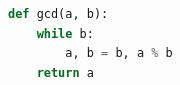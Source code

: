\documentclass{article}
\begin{document}
\begin{lstlisting}[language=Python,caption={Euclidean algorithm},label={lst:gcd}]
def gcd(a, b):
    while b:
        a, b = b, a % b
    return a
\end{lstlisting}
\end{document}
